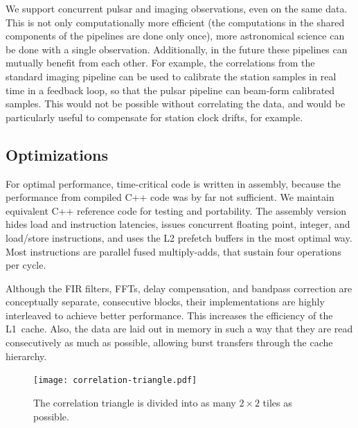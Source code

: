 \documentclass{sig-alternate}
\begin{document}
We support concurrent pulsar and imaging observations, even on the same data.
This is not only computationally more efficient (the computations in the
shared components of the pipelines are done only once), more astronomical
science can be done with a single observation.
Additionally, in the future these pipelines can mutually benefit from each
other.
For example, the correlations from the standard imaging pipeline can be used
to calibrate the station samples in real time in a feedback loop, so that the
pulsar pipeline can beam-form calibrated samples.
This would not be possible without correlating the data, and would be
particularly useful to compensate for station clock drifts, for example.


\subsection{Optimizations}

For optimal performance, time-critical code is written in assembly,
because the performance from compiled C++ code was by far not sufficient.
We maintain equivalent C++ reference code for testing and portability.
The assembly version hides load and instruction latencies, issues concurrent
floating point, integer, and load/store instructions,
and uses the L2 prefetch buffers in the most optimal way.
Most instructions are parallel fused multiply-adds, that sustain four
operations per cycle.

Although the FIR filters, FFTs, delay compensation, and bandpass correction
are conceptually separate, consecutive blocks, their implementations are
highly interleaved to achieve better performance.
This increases the efficiency of the L1~cache.
Also, the data are laid out in memory in such a way that they are read
consecutively as much as possible, allowing burst transfers through the
cache hierarchy.

\begin{figure}[ht]
\begin{center}
\texttt{[image: correlation-triangle.pdf]}
\end{center}
\caption{The correlation triangle is divided into as many $2\times2$ tiles as possible.}
\label{fig:correlation-triangle}
\end{figure}
\end{document}
